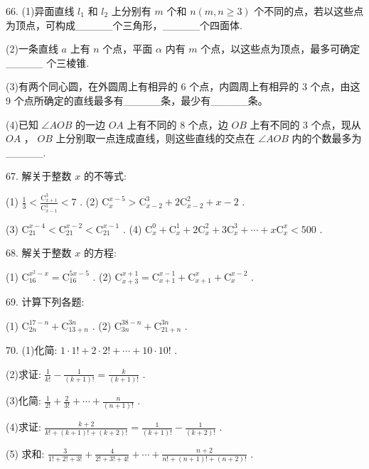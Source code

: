 \documentclass[10pt]{article}
\begin{document}
66. (1)异面直线 \({l}_{1}\) 和 \({l}_{2}\) 上分别有 \(m\) 个和 \(n\left( {m,n \geq  3}\right)\) 个不同的点，若以这些点为顶点，可构成\_\_\_\_\_个三角形，\_\_\_\_\_个四面体.

(2)一条直线 \(a\) 上有 \(n\) 个点，平面 \(\alpha\) 内有 \(m\) 个点，以这些点为顶点，最多可确定\_\_\_\_\_ 个三棱锥.

(3)有两个同心圆，在外圆周上有相异的 6 个点，内圆周上有相异的 3 个点，由这 9 个点所确定的直线最多有\_\_\_\_\_条，最少有\_\_\_\_\_条。

(4)已知 \(\angle {AOB}\) 的一边 \({OA}\) 上有不同的 8 个点，边 \({OB}\) 上有不同的 3 个点，现从 \({OA}\) ， \({OB}\) 上分别取一点连成直线，则这些直线的交点在 \(\angle {AOB}\) 内的个数最多为\_\_\_\_\_.

67. 解关于整数 \(x\) 的不等式:

(1) \(\frac{1}{3} < \frac{{\mathrm{C}}_{x + 1}^{3}}{{\mathrm{C}}_{x - 1}^{1}} < 7\) . (2) \({\mathrm{C}}_{x}^{x - 5} > {\mathrm{C}}_{x - 2}^{3} + 2{\mathrm{C}}_{x - 2}^{2} + x - 2\) .

(3) \({\mathrm{C}}_{21}^{x - 4} < {\mathrm{C}}_{21}^{x - 2} < {\mathrm{C}}_{21}^{x - 1}\) . (4) \({\mathrm{C}}_{x}^{0} + {\mathrm{C}}_{x}^{1} + 2{\mathrm{C}}_{x}^{2} + 3{\mathrm{C}}_{x}^{3} + \cdots  + x{\mathrm{C}}_{x}^{x} < {500}\) .

68. 解关于整数 \(x\) 的方程:

(1) \({\mathrm{C}}_{16}^{{x}^{2} - x} = {\mathrm{C}}_{16}^{{5x} - 5}\) . (2) \({\mathrm{C}}_{x + 3}^{x + 1} = {\mathrm{C}}_{x + 1}^{x - 1} + {\mathrm{C}}_{x + 1}^{x} + {\mathrm{C}}_{x}^{x - 2}\) .

69. 计算下列各题:

(1) \({\mathrm{C}}_{2n}^{{17} - n} + {\mathrm{C}}_{{13} + n}^{3n}\) . (2) \({\mathrm{C}}_{3n}^{{38} - n} + {\mathrm{C}}_{{21} + n}^{3n}\) .

70. (1)化简: \(1 \cdot  1! + 2 \cdot  2! + \cdots  + {10} \cdot  {10}!\) .

(2)求证: \(\frac{1}{k!} - \frac{1}{\left( {k + 1}\right) !} = \frac{k}{\left( {k + 1}\right) !}\) .

(3)化简: \(\frac{1}{2!} + \frac{2}{3!} + \cdots  + \frac{n}{\left( {n + 1}\right) !}\) .

(4)求证: \(\frac{k + 2}{k! + \left( {k + 1}\right) ! + \left( {k + 2}\right) !} = \frac{1}{\left( {k + 1}\right) !} - \frac{1}{\left( {k + 2}\right) !}\) .

(5) 求和: \(\frac{3}{1! + 2! + 3!} + \frac{4}{2! + 3! + 4!} + \cdots  + \frac{n + 2}{n! + \left( {n + 1}\right) ! + \left( {n + 2}\right) !}\) .
\end{document}
